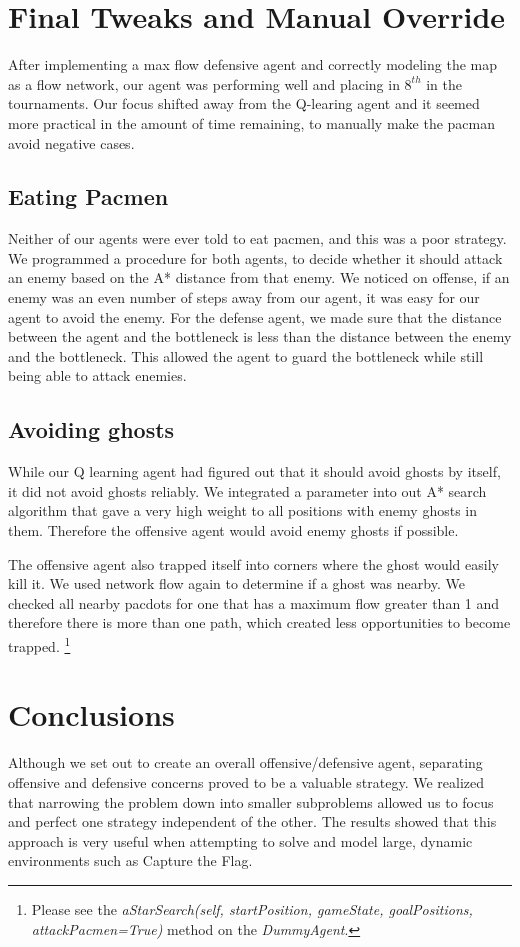 \documentclass[11pt]{article}
\begin{document}
\section{Final Tweaks and Manual Override}

After implementing a max flow defensive agent and correctly modeling the map as a flow network,
our agent was performing well and placing in $8^{th}$ in the tournaments.
Our focus shifted away from the Q-learing agent and it seemed more practical in the amount of time remaining,
to manually make the pacman avoid negative cases.

\subsection{Eating Pacmen}
Neither of our agents were ever told to eat pacmen, and this was a poor strategy.
We programmed a procedure for both agents, to decide whether it should attack an enemy based on the A* distance from that enemy.
We noticed on offense, if an enemy was an even number of steps away from our agent, it was easy for our agent to avoid the
enemy. For the defense agent, we made sure that the distance between
the agent and the bottleneck is less than the distance between the enemy and the bottleneck.
This allowed the agent to guard the bottleneck while still being able to attack enemies.

\subsection{Avoiding ghosts}
While our Q learning agent had figured out that it should avoid ghosts by itself, it did not avoid ghosts reliably.
We integrated a parameter into out A* search algorithm that gave a very high weight to
all positions with enemy ghosts in them. Therefore the offensive agent would avoid enemy ghosts if possible. \

The offensive agent also trapped itself into corners where the ghost would easily kill it.
We used network flow again to determine if a ghost was nearby.
We checked all nearby pacdots for one that has a maximum flow greater than 1 and therefore
there is more than one path, which created less opportunities to become trapped.
\footnote{Please see the \textit{aStarSearch(self, startPosition, gameState, goalPositions, attackPacmen=True)} method
on the \textit{DummyAgent}.}


\section{Conclusions}
Although we set out to create an overall offensive/defensive agent, separating
offensive and defensive concerns proved to be a valuable strategy. We realized that
narrowing the problem down into smaller subproblems allowed us to focus and perfect
one strategy independent of the other. The results showed that this approach is very
useful when attempting to solve and model large, dynamic environments such as Capture the Flag.
\end{document}
